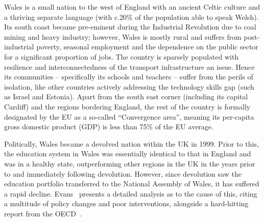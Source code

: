 \documentclass[conference]{IEEEtran}
\begin{document}
Wales is a small nation to the west of England with an ancient Celtic
culture and a thriving separate language (with c.20\% of the population able to
speak Welsh).  Its south coast became pre-eminent during the
Industrial Revolution due to coal mining and heavy industry; however,
Wales is mostly rural and suffers from post-industrial poverty,
seasonal employment and the dependence on the public sector for a
significant proportion of jobs. The country is sparsely populated with
resilience and interconnectedness of the transport infrastructure an
issue.  Hence its communities -- specifically its schools and
teachers -- suffer from the perils of isolation, like other countries
actively addressing the technology skills gap (such as Israel and
Estonia). Apart from the south east corner (including its capital
Cardiff) and the regions bordering England, the rest of the country is
formally designated by the EU as a so-called ``Convergence area'',
meaning its per-capita gross domestic product (GDP) is less than 75\%
of the EU average.

Politically, Wales became a devolved nation within the UK in 1999.
Prior to this, the education system in Wales was essentially
identical to that in England and was in a healthy state, outperforming
other regions in the UK in the years prior to and immediately
following devolution.  However, since devolution saw the education
portfolio transferred to the National Assembly of Wales, it has
suffered a rapid decline. Evans~\cite{Evans:2015} presents a
detailed analysis as to the cause of this, citing a multitude of
policy changes and poor interventions, alongside a hard-hitting report
from the OECD~\cite{oecdwales:2014}.

\end{document}
